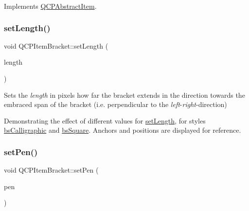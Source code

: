 Implements \mbox{\hyperlink{class_q_c_p_abstract_item_ae41d0349d68bb802c49104afd100ba2a}{Q\+C\+P\+Abstract\+Item}}.

\mbox{\label{class_q_c_p_item_bracket_ac7cfc3da7da9b5c5ac5dfbe4f0351b2a}} 
\subsubsection{\texorpdfstring{set\+Length()}{setLength()}}
{\footnotesize\ttfamily void Q\+C\+P\+Item\+Bracket\+::set\+Length (\begin{DoxyParamCaption}\item[{double}]{length }\end{DoxyParamCaption})}

Sets the {\itshape length} in pixels how far the bracket extends in the direction towards the embraced span of the bracket (i.\+e. perpendicular to the {\itshape left}-\/{\itshape right}-\/direction)

 \begin{center}Demonstrating the effect of different values for \mbox{\hyperlink{class_q_c_p_item_bracket_ac7cfc3da7da9b5c5ac5dfbe4f0351b2a}{set\+Length}}, for styles \mbox{\hyperlink{class_q_c_p_item_bracket_a7ac3afd0b24a607054e7212047d59dbda8f29f5ef754e2dc9a9efdedb2face0f3}{bs\+Calligraphic}} and \mbox{\hyperlink{class_q_c_p_item_bracket_a7ac3afd0b24a607054e7212047d59dbda7f9df4a7359bfe3dac1dbe4ccf5d220c}{bs\+Square}}. Anchors and positions are displayed for reference.\end{center}  \mbox{\label{class_q_c_p_item_bracket_ab13001d9cc5d8f9e56ea15bdda682acb}} 
\subsubsection{\texorpdfstring{set\+Pen()}{setPen()}}
{\footnotesize\ttfamily void Q\+C\+P\+Item\+Bracket\+::set\+Pen (\begin{DoxyParamCaption}\item[{const Q\+Pen \&}]{pen }\end{DoxyParamCaption})}

